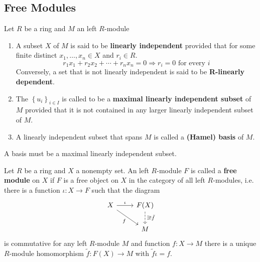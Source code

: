 \subsection{Free Modules} %
\begin{definition}
    Let $R$ be a ring and $M$ an left $R$-module
    \begin{enumerate}
        \item
              A subset $X$ of $M$ is said to be \textbf{linearly independent} provided that for some finite distinct $x_1, \ldots, x_n \in X$ and $r_i \in R$.
              \begin{equation*}
                  r_1 x_1+r_2 x_2+\cdots+r_n x_n=0 \Rightarrow r_i=0 \text { for every } i
              \end{equation*}
              Conversely, a set that is not linearly independent is said to be \textbf{R-linearly dependent}.
        \item
              The $\left\{u_i\right\}_{i\in I}$ is called to be a \textbf{maximal linearly independent subset} of $M$ provided that it is not contained in any larger linearly independent subset of $M$.
        \item
              A linearly independent subset that spans $M$ is called a \textbf{(Hamel) basis} of $M$.
    \end{enumerate}
    \begin{remark}
        A basis must be a maximal linearly independent subset.
    \end{remark}
\end{definition}


\begin{definition}
    Let $R$ be a ring and $X$ a nonempty set.
    An left $R$-module $F$ is called a \textbf{free module} on ${X}$ if $F$ is a free object on $X$ in the category of all left $R$-modules, i.e.  there is a function $\iota: X \rightarrow F$ such that the diagram
    \begin{equation*}
        \begin{tikzcd}
            X \arrow[r, "\iota"] \arrow[dr, "f"'] & F(X) \arrow[d, "\exists ! \tilde{f}", dashed] \\
            & M
        \end{tikzcd}
    \end{equation*}
    is commutative for any left $R$-module $M$ and function $f: X \rightarrow M$ there is a unique $R$-module homomorphism $\tilde{f}: F \left(X\right)\rightarrow M$ with $\tilde{f}\iota=f$.
\end{definition}


